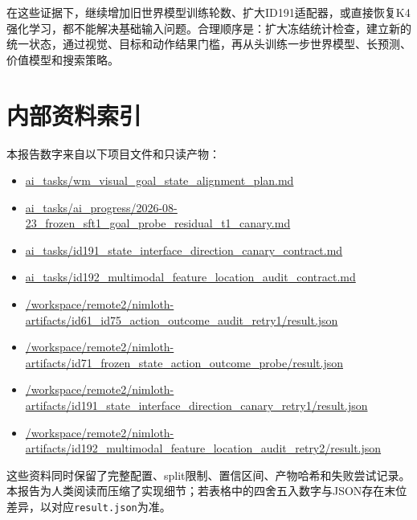 \documentclass[UTF8,11pt,a4paper,fontset=none]{ctexart}
\newcommand{\code}[1]{\texttt{#1}}
\begin{document}
在这些证据下，继续增加旧世界模型训练轮数、扩大ID191适配器，或直接恢复K4强化学习，都不能解决基础输入问题。合理顺序是：扩大冻结统计检查，建立新的统一状态，通过视觉、目标和动作结果门槛，再从头训练一步世界模型、长预测、价值模型和搜索策略。

\appendix
\section{内部资料索引}

本报告数字来自以下项目文件和只读产物：

\begin{itemize}
  \item \url{ai_tasks/wm_visual_goal_state_alignment_plan.md}
  \item \url{ai_tasks/ai_progress/2026-08-23_frozen_sft1_goal_probe_residual_t1_canary.md}
  \item \url{ai_tasks/id191_state_interface_direction_canary_contract.md}
  \item \url{ai_tasks/id192_multimodal_feature_location_audit_contract.md}
  \item \url{/workspace/remote2/nimloth-artifacts/id61_id75_action_outcome_audit_retry1/result.json}
  \item \url{/workspace/remote2/nimloth-artifacts/id71_frozen_state_action_outcome_probe/result.json}
  \item \url{/workspace/remote2/nimloth-artifacts/id191_state_interface_direction_canary_retry1/result.json}
  \item \url{/workspace/remote2/nimloth-artifacts/id192_multimodal_feature_location_audit_retry2/result.json}
\end{itemize}

这些资料同时保留了完整配置、split限制、置信区间、产物哈希和失败尝试记录。本报告为人类阅读而压缩了实现细节；若表格中的四舍五入数字与JSON存在末位差异，以对应\code{result.json}为准。
\end{document}
